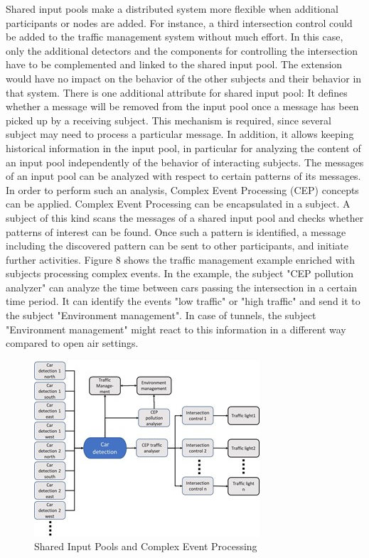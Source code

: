 Shared input pools make a distributed system more flexible when additional participants or nodes are added. For instance, a third intersection control could be added to the traffic management system without much effort. In this case, only the additional detectors and the components for controlling the intersection have to be complemented and linked to the shared input pool. The extension would have no impact on the behavior of the other subjects and their behavior in that system.
There is one additional attribute for shared input pool: It defines whether a message will be removed from the input pool once a message has been picked up by a receiving subject. This mechanism is required, since several subject may need to process a particular message. In addition, it allows keeping historical information in the input pool, in particular for analyzing the content of an input pool independently of the behavior of interacting subjects. 
The messages of an input pool can be analyzed with respect to certain patterns of its messages. In order to perform such an analysis, Complex Event Processing (CEP) concepts can be applied. Complex Event Processing can be encapsulated in a subject. A subject of this kind scans the messages of a shared input pool and checks whether patterns of interest can be found. Once such a pattern is identified, a message including the discovered pattern can be sent to other participants, and initiate further activities. Figure 8 shows the traffic management example enriched with subjects processing complex events.
In the example, the subject "CEP pollution analyzer" can analyze the time between cars passing the intersection in a certain time period. It can identify the events "low traffic" or "high traffic" and send it to the subject "Environment management". In case of tunnels, the subject "Environment management" might react to this information in a different way compared to open air settings. 


\begin{figure}
	\centering
	\includegraphics[width=0.7\linewidth]{Figures/Chapter5/figuresshared/SharedInputPoolEvent.jpg}
	\caption[Shared Input Pools and Complex Event Processing]{Shared Input Pools and Complex Event Processing}
	\label{fig:sharedInputPoolEvents}
\end{figure}

